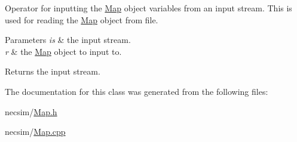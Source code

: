 Operator for inputting the \hyperlink{class_map}{Map} object variables from an input stream. This is used for reading the \hyperlink{class_map}{Map} object from file. 


\begin{DoxyParams}{Parameters}
{\em is} & the input stream. \\
\hline
{\em r} & the \hyperlink{class_map}{Map} object to input to. \\
\hline
\end{DoxyParams}
\begin{DoxyReturn}{Returns}
the input stream. 
\end{DoxyReturn}


The documentation for this class was generated from the following files\+:\begin{DoxyCompactItemize}
\item 
necsim/\hyperlink{_map_8h}{Map.\+h}\item 
necsim/\hyperlink{_map_8cpp}{Map.\+cpp}\end{DoxyCompactItemize}
